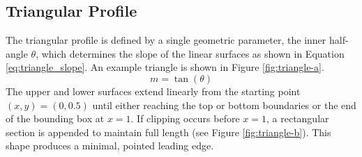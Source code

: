 \documentclass[11pt]{article}
\begin{document}
\subsection{Triangular Profile}
The triangular profile is defined by a single geometric parameter, the inner half-angle $\theta$, which determines the slope of the linear surfaces as shown in Equation \ref{eq:triangle_slope}. An example triangle is shown in Figure \ref{fig:triangle-a}.
\begin{equation}
m = \tan\!\left(\theta\right)
\label{eq:triangle_slope}
\end{equation}
The upper and lower surfaces extend linearly from the starting point $(x,y) = (0,0.5)$ until either reaching the top or bottom boundaries or the end of the bounding box at $x = 1$. If clipping occurs before $x = 1$, a rectangular section is appended to maintain full length (see Figure \ref{fig:triangle-b}). This shape produces a minimal, pointed leading edge. 
\end{document}
